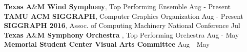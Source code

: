 \documentclass[12pt]{article}
\begin{document}
\begin{flushleft}
\begin{outline}[compactitem]
\1      \textbf{Texas A$\&$M Wind Symphony}, Top Performing Ensemble \hfill Aug  - Present
\1      \textbf{TAMU ACM SIGGRAPH}, Computer Graphics Organization \hfill Aug  - Present
\1      \textbf{SIGGRAPH 2016}, Assoc. of Computing Machinery National Conference \hfill Jul 
\1      \textbf{Texas A$\&$M Symphony Orchestra}  , Top Performing Orchestra \hfill Aug  - May 
\1      \textbf{Memorial Student Center Visual Arts Committee} \hfill Aug  - May 

\end{outline}
\end{flushleft}
\end{document}

